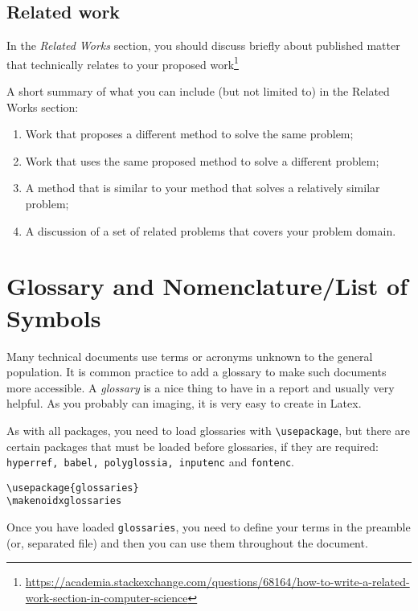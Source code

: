\subsection{Related work}
\label{sec:relatedwork}

In the \textit{Related Works} section, you should discuss briefly about published matter that technically relates to your proposed work\footnote{\url{https://academia.stackexchange.com/questions/68164/how-to-write-a-related-work-section-in-computer-science}}

A short summary of what you can include (but not limited to) in the Related Works section:
\begin{enumerate}
    \item Work that proposes a different method to solve the same problem;
    \item Work that uses the same proposed method to solve a different problem;
    \item A method that is similar to your method that solves a relatively similar problem;
    \item A discussion of a set of related problems that covers your problem domain.
\end{enumerate}


\section{Glossary and Nomenclature/List of Symbols} %
\label{sec:glossary}

Many technical documents use terms or acronyms unknown to the general population. It is common practice to add a glossary to make such documents more accessible. A \textit{glossary} is a nice thing to have in a report and usually very helpful. As you probably can imaging, it is very easy to create in Latex.

As with all packages, you need to load glossaries with \verb|\usepackage|, but there are certain packages that must be loaded before glossaries, if they are required: \texttt{hyperref, babel, polyglossia, inputenc} and \texttt{fontenc}.

\begin{verbatim}
\usepackage{glossaries} 
\makenoidxglossaries
\end{verbatim}

Once you have loaded \texttt{glossaries}, you need to define your terms in the preamble (or, separated file) and then you can use them throughout the document.

